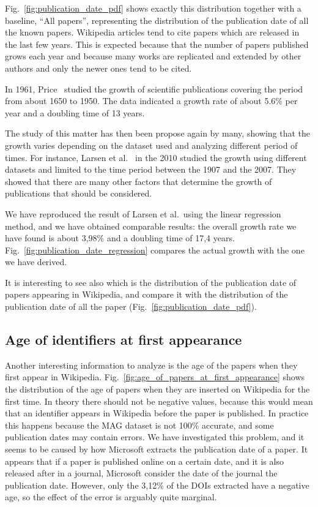 Fig.~\ref{fig:publication_date_pdf} shows exactly this distribution together with a baseline, ``All papers'', representing the distribution of the publication date of all the known papers.
Wikipedia articles tend to cite papers which are released in the last few years.
This is expected because that the number of papers published grows each year and because many works are replicated and extended by other authors and only the newer ones tend to be cited.


In 1961, Price~\cite{Price1961} studied the growth of scientific publications covering the period from about 1650 to 1950.
The data indicated a growth rate of about 5.6\% per year and a doubling time of 13 years.

The study of this matter has then been propose again by many, showing that the growth varies depending on the dataset used and analyzing different period of times.
For instance, Larsen et al.~\cite{Larsen2010} in the 2010 studied the growth using different datasets and limited to the time period between the 1907 and the 2007.
They showed that there are many other factors that determine the growth of publications that should be considered.

We have reproduced the result of Larsen et al.\ using the linear regression method, and we have obtained comparable results: the overall growth rate we have found is about 3,98\% and a doubling time of 17,4 years.
Fig.~\ref{fig:publication_date_regression} compares the actual growth with the one we have derived.

It is interesting to see also which is the distribution of the publication date of papers appearing in Wikipedia, and compare it with the distribution of the publication date of all the paper (Fig.~\ref{fig:publication_date_pdf}).



\subsection{Age of identifiers at first appearance}
Another interesting information to analyze is the age of the papers when they first appear in Wikipedia.
Fig.~\ref{fig:age_of_papers_at_first_appearance} shows the distribution of the age of papers when they are inserted on Wikipedia for the first time.
In theory there should not be negative values, because this would mean that an identifier appears in Wikipedia before the paper is published.
In practice this happens because the \ac{MAG} dataset is not 100\% accurate, and some publication dates may contain errors.
We have investigated this problem, and it seems to be caused by how Microsoft extracts the publication date of a paper.
It appears that if a paper is published online on a certain date, and it is also released after in a journal, Microsoft consider the date of the journal the publication date.
However, only the 3,12\% of the \acp{DOI} extracted have a negative age, so the effect of the error is arguably quite marginal.

